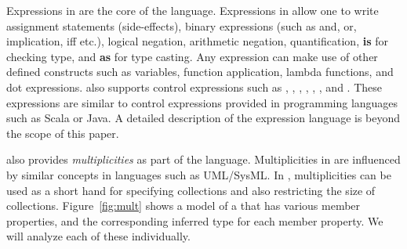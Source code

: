 Expressions in \Klang{} are the core of the language. Expressions in
\Klang{} allow one to write assignment statements (side-effects),
binary expressions (such as and, or, implication, iff etc.), logical
negation, arithmetic negation, quantification, {\bf is} for checking
type, and {\bf as} for type casting. Any expression can make use of
other defined constructs such as variables, function application,
lambda functions, and dot expressions. \Klang{} also supports control
expressions such as , , ,
, , , and . These
expressions are similar to control expressions provided in programming
languages such as Scala or Java. A detailed description of the
expression language is beyond the scope of this paper.

\Klang{} also provides {\em multiplicities} as part of the
language. Multiplicities in \Klang{} are influenced by similar
concepts in languages such as UML/SysML. In \Klang{},
multiplicities can be used as a short hand for specifying collections
and also restricting the size of collections. Figure~\ref{fig:mult}
shows a \Klang{} model of a  that has various member
properties, and the corresponding inferred type for each member
property. We will analyze each of these individually.


